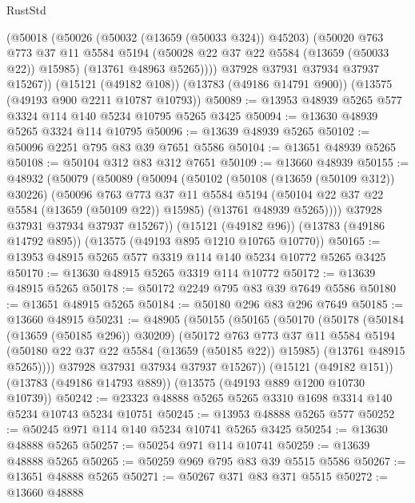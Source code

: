 \begin{lexlean}{RustStd}
\begin{coremodule}
        (@50018
          (@50026
            (@50032 (@13659 (@50033 @324)) @45203)
            (@50020
              @763
              @773
              @37
              @11
              @5584
              @5194
              (@50028 @22 @37 @22 @5584 (@13659 (@50033 @22)) @15985)
              (@13761 @48963 @5265))))
        @37928
        @37931
        @37934
        @37937
        @15267))
    (@15121 (@49182 @108))
    (@13783 (@49186 @14791 @900))
    (@13575 (@49193 @900 @2211 @10787 @10793))
@50089 := @13953 @48939 @5265 @577 @3324 @114 @140 @5234 @10795 @5265 @3425
@50094 := @13630 @48939 @5265 @3324 @114 @10795
@50096 := @13639 @48939 @5265
@50102 := @50096 @2251 @795 @83 @39 @7651 @5586
@50104 := @13651 @48939 @5265
@50108 := @50104 @312 @83 @312 @7651
@50109 := @13660 @48939
@50155 := @48932
    (@50079
      (@50089
        (@50094
          (@50102
            (@50108 (@13659 (@50109 @312)) @30226)
            (@50096
              @763
              @773
              @37
              @11
              @5584
              @5194
              (@50104 @22 @37 @22 @5584 (@13659 (@50109 @22)) @15985)
              (@13761 @48939 @5265))))
        @37928
        @37931
        @37934
        @37937
        @15267))
    (@15121 (@49182 @96))
    (@13783 (@49186 @14792 @895))
    (@13575 (@49193 @895 @1210 @10765 @10770))
@50165 := @13953 @48915 @5265 @577 @3319 @114 @140 @5234 @10772 @5265 @3425
@50170 := @13630 @48915 @5265 @3319 @114 @10772
@50172 := @13639 @48915 @5265
@50178 := @50172 @2249 @795 @83 @39 @7649 @5586
@50180 := @13651 @48915 @5265
@50184 := @50180 @296 @83 @296 @7649
@50185 := @13660 @48915
@50231 := @48905
    (@50155
      (@50165
        (@50170
          (@50178
            (@50184 (@13659 (@50185 @296)) @30209)
            (@50172
              @763
              @773
              @37
              @11
              @5584
              @5194
              (@50180 @22 @37 @22 @5584 (@13659 (@50185 @22)) @15985)
              (@13761 @48915 @5265))))
        @37928
        @37931
        @37934
        @37937
        @15267))
    (@15121 (@49182 @151))
    (@13783 (@49186 @14793 @889))
    (@13575 (@49193 @889 @1200 @10730 @10739))
@50242 := @23323 @48888 @5265 @5265 @3310 @1698 @3314 @140 @5234 @10743 @5234 @10751
@50245 := @13953 @48888 @5265 @577
@50252 := @50245 @971 @114 @140 @5234 @10741 @5265 @3425
@50254 := @13630 @48888 @5265
@50257 := @50254 @971 @114 @10741
@50259 := @13639 @48888 @5265
@50265 := @50259 @969 @795 @83 @39 @5515 @5586
@50267 := @13651 @48888 @5265
@50271 := @50267 @371 @83 @371 @5515
@50272 := @13660 @48888

\end{coremodule}
\end{lexlean}
